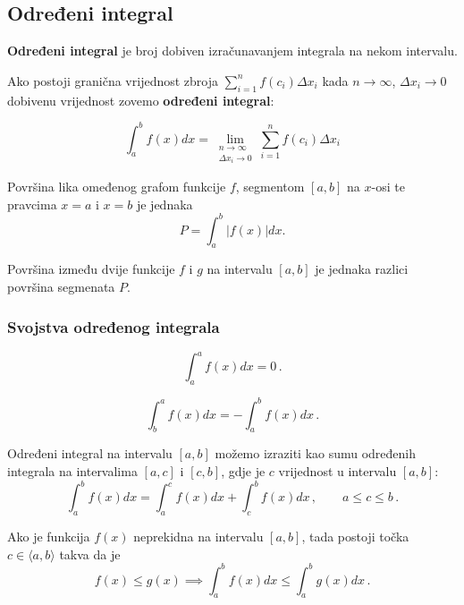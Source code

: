 \subsection{Određeni integral}

\textbf{Određeni integral} je broj dobiven izračunavanjem integrala na nekom
intervalu.

\begin{definition}
    Ako postoji granična vrijednost zbroja $\sum_{i=1}^n f(c_i)\Delta x_i$ kada $n \to \infty$, $\Delta x_i \to 0$ dobivenu vrijednost zovemo \textbf{određeni integral}:

    $$
        \int_a^b f(x)dx = \lim_{\substack{n \to \infty \\ \Delta x_i \to 0}} \sum_{i=1}^n f(c_i)\Delta x_i
    $$
\end{definition}

Površina lika omeđenog grafom funkcije $f$, segmentom $[a, b]$ na $x$-osi te pravcima $x=a$ i $x=b$ je jednaka
$$
    P=\int_a^b |f(x)| dx.
$$

Površina između dvije funkcije $f$ i $g$ na intervalu $[a, b]$ je jednaka razlici površina segmenata $P$.

\subsubsection{Svojstva određenog integrala}

\begin{proposition}
    $$
    \int_a^a f(x)dx = 0\,.
    $$
\end{proposition}

\begin{proposition}
    $$
    \int_b^a f(x)dx = -\int_a^b f(x)dx\,.
    $$
\end{proposition}

\begin{proposition}
    Određeni integral na intervalu $[a, b]$ možemo izraziti kao sumu određenih integrala na intervalima $[a, c]$ i $[c, b]$, gdje je $c$ vrijednost u intervalu $[a, b]$:
    $$
    \int_a^b f(x)dx = \int_a^c f(x)dx + \int_c^b f(x)dx\,,\qquad a\leq c \leq b\,.
    $$
\end{proposition}

\begin{proposition}
    Ako je funkcija $f(x)$ neprekidna na intervalu $[a, b]$, tada postoji točka $c \in \langle a, b\rangle$ takva da je
    $$
    f(x) \leq g(x) \implies \int_a^b f(x)dx \leq \int_a^b g(x)dx\,.
    $$
\end{proposition}

